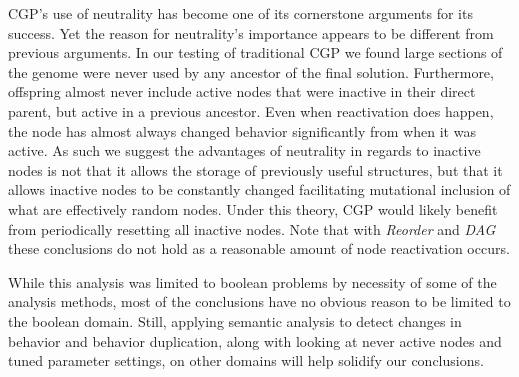 \documentclass[journal]{IEEEtran}
\begin{document}
CGP's use of neutrality has become one of its cornerstone arguments for its success.
Yet the reason for neutrality's importance appears to be different from previous
arguments.  In our testing of traditional CGP we found large sections of the
genome were never used by any ancestor of the final solution.  Furthermore,
offspring almost never include active nodes that were inactive in their direct
parent, but active in a previous ancestor.  Even when reactivation does happen,
the node has almost always changed behavior significantly from when it was active.
As such we suggest the advantages of neutrality in regards to inactive nodes is
not that it allows the storage of previously useful structures, but that it allows
inactive nodes to be constantly changed facilitating mutational inclusion of what
are effectively random nodes.  Under this theory, CGP would likely benefit from periodically resetting
all inactive nodes.  Note that with \emph{Reorder}
and \emph{DAG} these conclusions do not hold as a reasonable amount of node
reactivation occurs.

While this analysis was limited to boolean problems by necessity of some of
the analysis methods, most of the conclusions have no obvious reason to be
limited to the boolean domain.  Still, applying semantic analysis
to detect changes in behavior and behavior duplication, along with looking at
never active nodes and tuned parameter settings, on other domains will help
solidify our conclusions.


%
\end{document}
